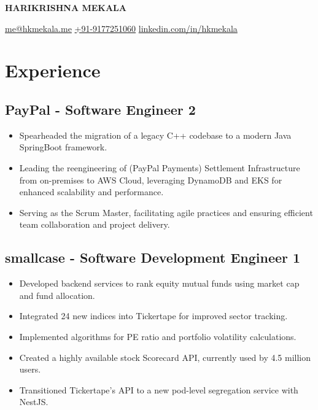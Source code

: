 \documentclass[11pt]{article}
\begin{document}
\begin{center}
  {\Huge\bfseries\uppercase{Harikrishna Mekala}} \\ \medskip

  \href{mailto:me@hkmekala.me}{me@hkmekala.me} \quad
  \href{tel:+919177251060}{+91-9177251060} \quad
  \href{https://www.linkedin.com/in/hkmekala}{linkedin.com/in/hkmekala}
\end{center}

\section{Experience}
\subsection{PayPal - Software Engineer 2  }
\begin{itemize}
	\item Spearheaded the migration of a legacy C++ codebase to a modern Java SpringBoot framework.
	\item Leading the reengineering of (PayPal Payments) Settlement Infrastructure from on-premises to AWS Cloud, leveraging DynamoDB and EKS for enhanced scalability and performance.
    \item Serving as the Scrum Master, facilitating agile practices and ensuring efficient team collaboration and project delivery.
\end{itemize}

\subsection{smallcase - Software Development Engineer 1  }
\begin{itemize}
    \item Developed backend services to rank equity mutual funds using market cap and fund allocation.
    \item Integrated 24 new indices into Tickertape for improved sector tracking.
    \item Implemented algorithms for PE ratio and portfolio volatility calculations.
    \item Created a highly available stock Scorecard API, currently used by 4.5 million users.
    \item Transitioned Tickertape’s API to a new pod-level segregation service with NestJS.
\end{itemize}
\end{document}
